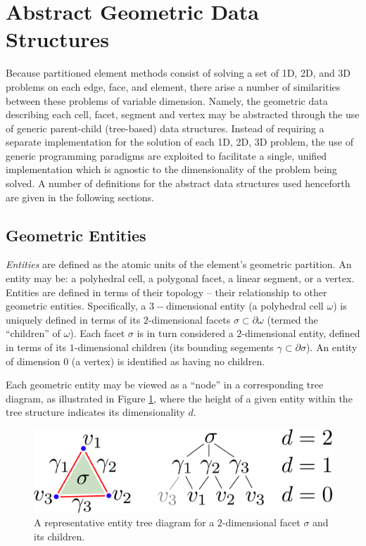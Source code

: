 \section{Abstract Geometric Data Structures}

	Because partitioned element methods consist of solving a set of 1D, 2D, and 3D problems on each edge, face, and element, there arise a number of similarities between these problems of variable dimension. Namely, the geometric data describing each cell, facet, segment and vertex may be abstracted through the use of generic parent-child (tree-based) data structures. Instead of requiring a separate implementation for the solution of each 1D, 2D, 3D problem, the use of generic programming paradigms are exploited to facilitate a single, unified implementation which is agnostic to the dimensionality of the problem being solved. A number of definitions for the abstract data structures used henceforth are given in the following sections.
	
\subsection*{Geometric Entities}

	\textit{Entities} are defined as the atomic units of the element's geometric partition. An entity may be: a polyhedral cell, a polygonal facet, a linear segment, or a vertex. Entities are defined in terms of their topology -- their relationship to other geometric entities. Specifically, a $3-$dimensional entity (a polyhedral cell $\omega$) is uniquely defined in terms of its $2$-dimensional facets $\sigma \subset \partial \omega$ (termed the ``children'' of $\omega$). Each facet $\sigma$ is in turn considered a $2$-dimensional entity, defined in terms of its $1$-dimensional children (its bounding segements $\gamma \subset \partial \sigma$). An entity of dimension $0$ (a vertex) is identified as having no children.
	
	Each geometric entity may be viewed as a ``node'' in a corresponding tree diagram, as illustrated in Figure \ref{fig:entity_tree}, where the height of a given entity within the tree structure indicates its dimensionality $d$.
	\begin{figure} [!ht]
		\centering
		\includegraphics[width = 5.0in]{figures/entity_tree.pdf}
		\caption{A representative entity tree diagram for a $2$-dimensional facet $\sigma$ and its children.}
		\label{fig:entity_tree}
	\end{figure}
	

